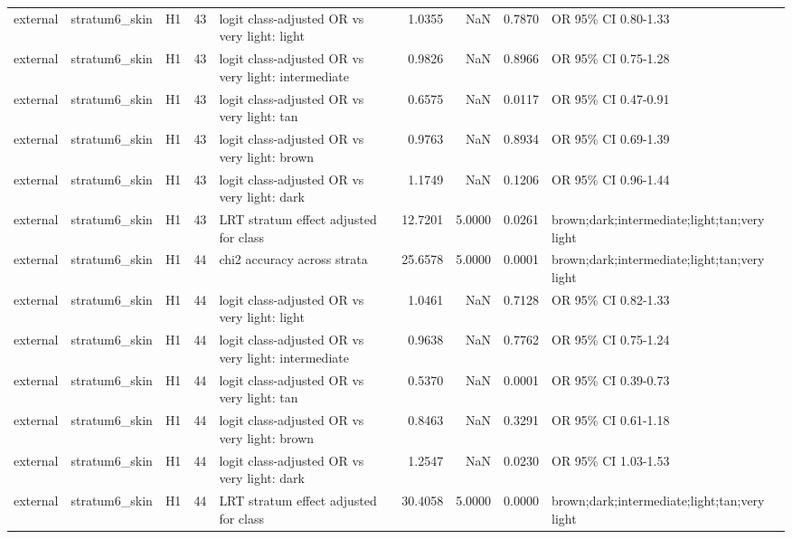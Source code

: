 \begin{tabular}{lllrlrrrl}
external & stratum6\_skin & H1 & 43 & logit class-adjusted OR vs very light: light & 1.0355 & NaN & 0.7870 & OR 95\% CI 0.80-1.33 \\
external & stratum6\_skin & H1 & 43 & logit class-adjusted OR vs very light: intermediate & 0.9826 & NaN & 0.8966 & OR 95\% CI 0.75-1.28 \\
external & stratum6\_skin & H1 & 43 & logit class-adjusted OR vs very light: tan & 0.6575 & NaN & 0.0117 & OR 95\% CI 0.47-0.91 \\
external & stratum6\_skin & H1 & 43 & logit class-adjusted OR vs very light: brown & 0.9763 & NaN & 0.8934 & OR 95\% CI 0.69-1.39 \\
external & stratum6\_skin & H1 & 43 & logit class-adjusted OR vs very light: dark & 1.1749 & NaN & 0.1206 & OR 95\% CI 0.96-1.44 \\
external & stratum6\_skin & H1 & 43 & LRT stratum effect adjusted for class & 12.7201 & 5.0000 & 0.0261 & brown;dark;intermediate;light;tan;very light \\
external & stratum6\_skin & H1 & 44 & chi2 accuracy across strata & 25.6578 & 5.0000 & 0.0001 & brown;dark;intermediate;light;tan;very light \\
external & stratum6\_skin & H1 & 44 & logit class-adjusted OR vs very light: light & 1.0461 & NaN & 0.7128 & OR 95\% CI 0.82-1.33 \\
external & stratum6\_skin & H1 & 44 & logit class-adjusted OR vs very light: intermediate & 0.9638 & NaN & 0.7762 & OR 95\% CI 0.75-1.24 \\
external & stratum6\_skin & H1 & 44 & logit class-adjusted OR vs very light: tan & 0.5370 & NaN & 0.0001 & OR 95\% CI 0.39-0.73 \\
external & stratum6\_skin & H1 & 44 & logit class-adjusted OR vs very light: brown & 0.8463 & NaN & 0.3291 & OR 95\% CI 0.61-1.18 \\
external & stratum6\_skin & H1 & 44 & logit class-adjusted OR vs very light: dark & 1.2547 & NaN & 0.0230 & OR 95\% CI 1.03-1.53 \\
external & stratum6\_skin & H1 & 44 & LRT stratum effect adjusted for class & 30.4058 & 5.0000 & 0.0000 & brown;dark;intermediate;light;tan;very light \\
\bottomrule
\end{tabular}
